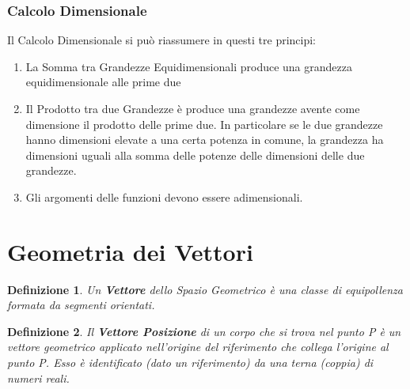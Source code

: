 \documentclass{article}
\newtheorem{defn}{Definizione}[section]
\begin{document}
\subsubsection{Calcolo Dimensionale}
Il Calcolo Dimensionale si può riassumere in questi tre principi:
\begin{enumerate}
    \item La Somma tra Grandezze Equidimensionali produce una grandezza equidimensionale alle prime due
    \item Il Prodotto tra due Grandezze è produce una grandezze avente come dimensione il prodotto delle prime due. In particolare se le due grandezze hanno dimensioni elevate a una certa potenza in comune, la grandezza ha dimensioni uguali alla somma delle potenze delle dimensioni delle due grandezze.
    \item Gli argomenti delle funzioni devono essere adimensionali.
\end{enumerate}

\section{Geometria dei Vettori}

\begin{defn}
Un \textbf{Vettore} dello Spazio Geometrico è una classe di equipollenza formata da segmenti orientati.
\end{defn}

\begin{defn}
Il \textbf{Vettore Posizione} di un corpo che si trova nel punto P è un vettore geometrico applicato nell'origine del riferimento che collega l'origine al punto P. Esso è identificato (dato un riferimento) da una terna (coppia) di numeri reali.
\end{defn}
\end{document}
